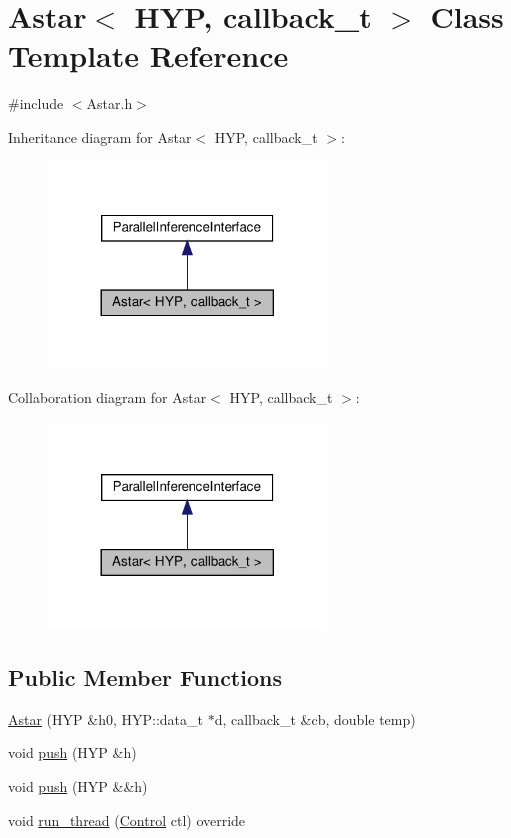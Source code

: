 \hypertarget{class_astar}{}\section{Astar$<$ H\+YP, callback\+\_\+t $>$ Class Template Reference}
\label{class_astar}


{\ttfamily \#include $<$Astar.\+h$>$}



Inheritance diagram for Astar$<$ H\+YP, callback\+\_\+t $>$\+:
\nopagebreak
\begin{figure}[H]
\begin{center}
\leavevmode
\includegraphics[width=209pt]{class_astar__inherit__graph}
\end{center}
\end{figure}


Collaboration diagram for Astar$<$ H\+YP, callback\+\_\+t $>$\+:
\nopagebreak
\begin{figure}[H]
\begin{center}
\leavevmode
\includegraphics[width=209pt]{class_astar__coll__graph}
\end{center}
\end{figure}
\subsection*{Public Member Functions}
\begin{DoxyCompactItemize}
\item 
\hyperlink{class_astar_acd10ee027c3fc2c2fe14fedc10e350f1}{Astar} (H\+YP \&h0, H\+Y\+P\+::data\+\_\+t $\ast$d, callback\+\_\+t \&cb, double temp)
\item 
void \hyperlink{class_astar_adc632480077c990ab12f88a85709b76f}{push} (H\+YP \&h)
\item 
void \hyperlink{class_astar_a689ddbddae5f21f26053d2d376c34095}{push} (H\+YP \&\&h)
\item 
void \hyperlink{class_astar_a962d234b6b109597c03516d61ff2cffc}{run\+\_\+thread} (\hyperlink{struct_control}{Control} ctl) override
\end{DoxyCompactItemize}
